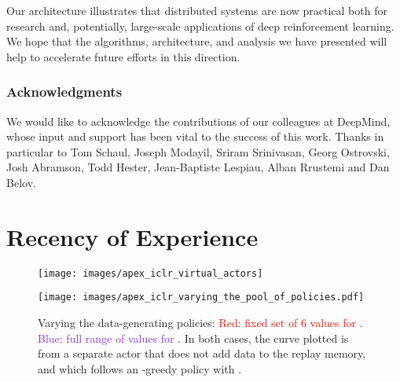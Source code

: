 \documentclass{article} \PassOptionsToPackage{usenames,dvipsnames}{xcolor}
\def\smallcaption#1{\caption{\small #1}\vspace{-0.4cm}}
\begin{document}
Our architecture illustrates that distributed systems are now practical both for research and, potentially, large-scale applications of deep reinforcement learning. 
We hope that the algorithms, architecture, and analysis we have presented will help to accelerate future efforts in this direction.

\newpage

\subsubsection*{Acknowledgments}

We would like to acknowledge the contributions of our colleagues at DeepMind, whose input and support has been vital to the success of this work. Thanks in particular to Tom Schaul, Joseph Modayil, Sriram Srinivasan, Georg Ostrovski, Josh Abramson, Todd Hester, Jean-Baptiste Lespiau, Alban Rrustemi and Dan Belov.




\newpage

\appendix

\section{Recency of Experience}

\begin{figure}
\begin{minipage}[t]{0.48\textwidth}
\centering
\texttt{[image: images/apex\_iclr\_virtual\_actors]}
\smallcaption{Testing whether improved performance is caused by recency alone:  denotes the number of actors,  the number of times each transition is replicated in the replay. The data in the run with ,  is therefore as recent as the data in the run with , , but performance is not as good.}
\label{fig:control_virtual_actors}
\end{minipage}
\hspace{0.03\textwidth}
\begin{minipage}[t]{0.48\textwidth}
\texttt{[image: images/apex\_iclr\_varying\_the\_pool\_of\_policies.pdf]}
\smallcaption{Varying the data-generating policies: \textcolor{Red}{Red: fixed set of 6 values for }. \textcolor{BlueViolet}{Blue: full range of values for }. In both cases, the curve plotted is from a separate actor that does not add data to the replay memory, and which follows an -greedy policy with .}
\label{fig:vary_policy_pool}
\end{minipage}
\end{figure}
\end{document}
